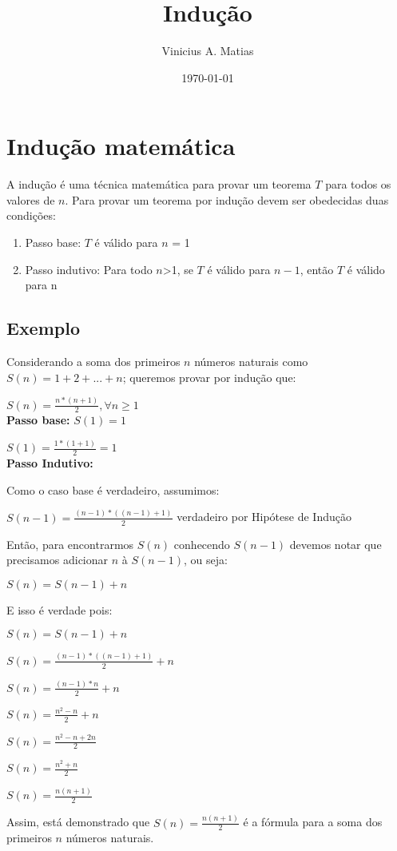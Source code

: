 \documentclass[a4paper, twocolumn]{article}
\title{Indução}
\author{Vinicius A. Matias}
\date{\today}
\theoremstyle{definition}
\begin{document}
	\maketitle
	
\section{Indução matemática}
A indução é uma técnica matemática para provar um teorema $T$ para todos os valores de $n$. Para provar um teorema por indução devem ser obedecidas duas condições:

\begin{enumerate}
	\item Passo base: $T$ é válido para $n$ = 1
	\item Passo indutivo: Para todo $n$>1, se $T$ é válido para $n-1$, então $T$ é válido para n
\end{enumerate}

\subsection{Exemplo}
Considerando a soma dos primeiros $n$ números naturais como $S(n) = 1 + 2 +...+ n$; queremos provar por indução que:

$S(n) = \frac{n*(n+1)}{2}, \forall n \geq 1$ \\

\textbf{Passo base:} $S(1) = 1$

$S(1) = \frac{1*(1+1)}{2} = 1$ \\

\textbf{Passo Indutivo:}

Como o caso base é verdadeiro, assumimos:

$S(n-1) =\frac{(n-1) * ((n-1)+1)}{2}$ verdadeiro por Hipótese de Indução 

Então, para encontrarmos $S(n)$ conhecendo $S(n-1)$ devemos notar que precisamos adicionar $n$ à $S(n-1)$, ou seja:

$S(n) = S(n-1) + n$

E isso é verdade pois:

$S(n) = S(n-1) + n$

$S(n) = \frac{(n-1) * ((n-1)+1)}{2} + n$

$S(n) = \frac{(n-1) * n}{2} + n$

$S(n) = \frac{n^2-n}{2} + n$

$S(n) = \frac{n^2-n + 2n}{2}$

$S(n) = \frac{n^2 + n}{2}$

$S(n) = \frac{n(n + 1)}{2}$

Assim, está demonstrado que $S(n) = \frac{n(n + 1)}{2}$ é a fórmula para a soma dos primeiros $n$ números naturais.
	
\end{document}
